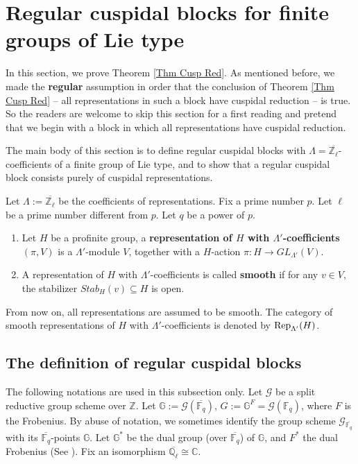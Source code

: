 	
	
	
	\section{Regular cuspidal blocks for finite groups of Lie type}\label{Sec Reg Cusp}
	
	In this section, we prove Theorem \ref{Thm Cusp Red}. As mentioned before, we made the \textbf{regular} assumption in order that the conclusion of Theorem \ref{Thm Cusp Red} -- all representations in such a block have cuspidal reduction -- is true. So the readers are welcome to skip this section for a first reading and pretend that we begin with a block in which all representations have cuspidal reduction.
	
	The main body of this section is to define regular cuspidal blocks with $\Lambda=\overline{\mathbb{Z}_{\ell}}$-coefficients of a finite group of Lie type, and to show that a regular cuspidal block consists purely of cuspidal representations.
	
	Let $\Lambda:=\overline{\mathbb{Z}_{\ell}}$ be the coefficients of representations. Fix a prime number $p$. Let $\ell$ be a prime number different from $p$. Let $q$ be a power of $p$.
	
	\begin{definition}
		\begin{enumerate}Let $\Lambda'$ be any ring.
			\item Let $H$ be a profinite group, a \textbf{representation of $H$ with $\Lambda'$-coefficients} $(\pi, V)$ is a $\Lambda'$-module $V$, together with a $H$-action $\pi: H \to GL_{\Lambda'}(V)$.
			\item A representation of $H$ with $\Lambda'$-coefficients is called \textbf{smooth} if for any $v \in V$, the stabilizer $Stab_H(v) \subseteq H$ is open.
		\end{enumerate}
	\end{definition}
	
	From now on, all representations are assumed to be smooth. The category of smooth representations of $H$ with $\Lambda'$-coefficients is denoted by $\operatorname{\operatorname{Rep}}_{\Lambda'}(H)$.
	
	\subsection{The definition of regular cuspidal blocks}
	
	The following notations are used in this subsection only. Let $\mathcal{G}$ be a split reductive group scheme over $\mathbb{Z}$. Let $\mathbb{G}:=\mathcal{G}(\overline{\mathbb{F}_q})$, $G:=\mathbb{G}^F=\mathcal{G}(\mathbb{F}_q)$, where $F$ is the Frobenius. By abuse of notation, we sometimes identify the group scheme $\mathcal{G}_{\overline{\mathbb{F}_q}}$ with its $\overline{\mathbb{F}_q}$-points $\mathbb{G}$. Let $\mathbb{G}^*$ be the dual group (over $\overline{\mathbb{F}_q}$) of $\mathbb{G}$, and $F^*$ the dual Frobenius (See \cite[Section 4.2]{carter1985finite}). Fix an isomorphism $\overline{\mathbb{Q}_{\ell}} \cong \mathbb{C}$. 
	
